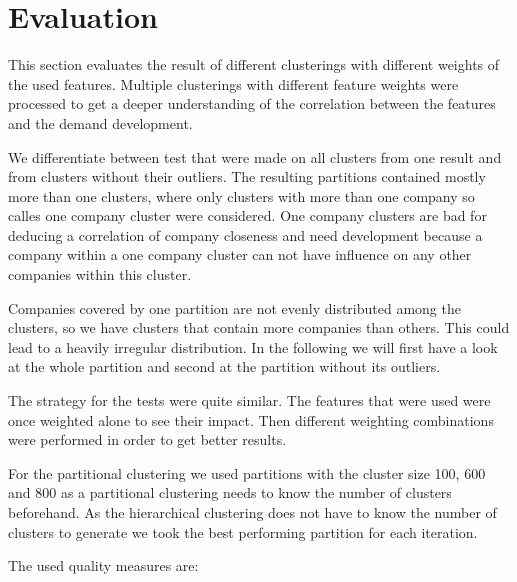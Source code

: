 \section{Evaluation}

This section evaluates the result of different clusterings with different weights of the used features.
Multiple clusterings with different feature weights were processed to get a deeper understanding
of the correlation between the features and the demand development.

We differentiate between test that were made on all clusters from one result and from clusters without their outliers.
The resulting partitions contained mostly more than one clusters, where only clusters with more than one company
so calles one company cluster were considered. One company clusters are bad for deducing a correlation of company closeness and need development because
a company within a one company cluster can not have influence on any other companies within this cluster.

Companies covered by one partition are not evenly distributed among the clusters, so we have clusters that contain more
companies than others. This could lead to a heavily irregular distribution. In the following we will first have a look
at the whole partition and second at the partition without its outliers.

The strategy for the tests were quite similar. The features that were used were once weighted alone
to see their impact. Then different weighting combinations were performed in order to get better results.

For the partitional clustering we used partitions with the cluster size 100, 600 and 800 as a partitional
clustering needs to know the number of clusters beforehand. As the hierarchical clustering does not have to
know the number of clusters to generate we took the best performing partition for each iteration.

The used quality measures are:

